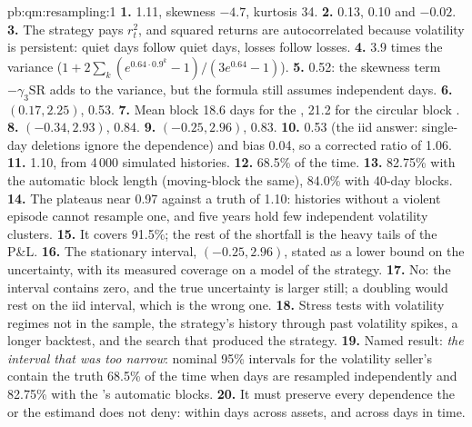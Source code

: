 \begin{solution}{pb:qm:resampling:1}
\textbf{1.}  1.11, skewness $-4.7$, kurtosis 34.
\textbf{2.} 0.13, 0.10 and $-0.02$.
\textbf{3.} The strategy pays $r_t^2$, and squared returns are autocorrelated because volatility is persistent: quiet days follow quiet days,
losses follow losses.
\textbf{4.} 3.9 times the variance ($1 + 2\sum_k(e^{0.64 \cdot 0.9^k} - 1)/(3e^{0.64} - 1)$).
\textbf{5.} 0.52: the skewness term $-\gamma_3\mathrm{SR}$ adds to the variance, but the formula still assumes independent days.
\textbf{6.} $(0.17, 2.25)$,  0.53.
\textbf{7.} Mean block 18.6 days for the , 21.2 for the circular block .
\textbf{8.} $(-0.34, 2.93)$,  0.84.
\textbf{9.} $(-0.25, 2.96)$,  0.83.
\textbf{10.}  0.53 (the iid answer: single-day deletions ignore the dependence) and bias 0.04, so a corrected ratio of 1.06.
\textbf{11.} 1.10, from 4\,000 simulated histories.
\textbf{12.} 68.5\% of the time.
\textbf{13.} 82.75\% with the automatic block length (moving-block the same), 84.0\% with 40-day blocks.
\textbf{14.} The   plateaus near 0.97 against a truth of 1.10: histories without a violent episode cannot resample
one, and five years hold few independent volatility clusters.
\textbf{15.} It covers 91.5\%; the rest of the shortfall is the heavy tails of the P\&L.
\textbf{16.} The stationary interval, $(-0.25, 2.96)$, stated as a lower bound on the uncertainty, with its measured coverage on a model of
the strategy.
\textbf{17.} No: the interval contains zero, and the true uncertainty is larger still; a doubling would rest on the iid interval, which is the
wrong one.
\textbf{18.} Stress tests with volatility regimes not in the sample, the strategy's history through past volatility spikes, a longer
backtest, and the search that produced the strategy.
\textbf{19.} Named result: \emph{the interval that was too narrow}: nominal 95\%  intervals for the volatility seller's  contain the truth 68.5\% of the time when days are resampled independently and 82.75\% with the 's automatic
blocks.
\textbf{20.} It must preserve every dependence the  or the estimand does not deny: within days across assets, and across
days in time.
\end{solution}

